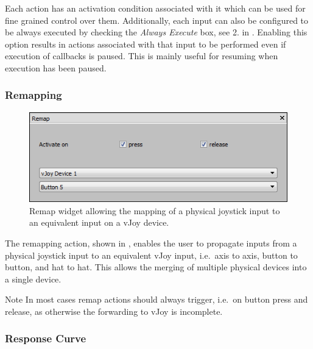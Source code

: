 \documentclass[a4, 10pt]{article}
\begin{document}
Each action has an activation condition associated with it which can be
used for fine grained control over them. Additionally, each input can
also be configured to be always executed by checking the \emph{Always
Execute} box, see 2. in . Enabling this option results
in actions associated with that input to be performed even if execution
of callbacks is paused. This is mainly useful for resuming when
execution has been paused.

\subsubsection{Remapping}

\begin{figure}[bt]
    \centering

    \includegraphics[width=0.75\linewidth]{images/action_remap}
    \caption{Remap widget allowing the mapping of a physical joystick
        input to an equivalent input on a vJoy device.}
    \label{fig:action_remap}
\end{figure}

The remapping action, shown in , enables the user
to propagate inputs from a physical joystick input to an equivalent vJoy
input, i.e.\ axis to axis, button to button, and hat to hat. This allows
the merging of multiple physical devices into a single device.

\vspace{1em}
\begin{bclogo}[
    couleur=yellow!40,
    couleurBord=orange!80,
    couleurBarre=orange!80,
    arrondi=0.1,
    logo=\bcinfo
]{Note}
    In most cases remap actions should always trigger, i.e.\ on button press and
    release, as otherwise the forwarding to vJoy is incomplete.
\end{bclogo}


\subsubsection{Response Curve}
\end{document}
